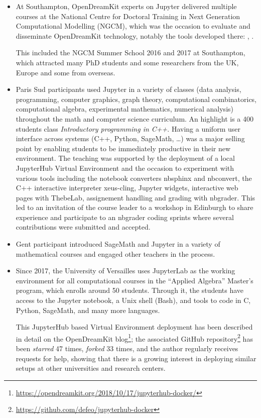 \documentclass{deliverablereport}
\begin{document}
\begin{itemize}
\item At Southampton, OpenDreamKit experts on Jupyter delivered
  multiple courses at the National Centre for Doctoral Training in
  Next Generation Computational Modelling (NGCM), which was the
  occasion to evaluate and disseminate OpenDreamKit technology,
  notably the tools developed there: ,
  .

  This included the NGCM Summer School 2016 and 2017 at Southampton,
  which attracted many PhD students and some researchers from the UK,
  Europe and some from overseas.

\item Paris Sud participants used Jupyter in a variety of classes
  (data analysis, programming, computer graphics, graph theory,
  computational combinatorics, computational algebra, experimental
  mathematics, numerical analysis) throughout the math and computer
  science curriculum. An highlight is a 400 students class
  \emph{Introductory programming in C++}. Having a uniform user
  interface across systems (C++, Python, SageMath, \ldots) was a major
  selling point by enabling students to be immediately productive in
  their new environment. The teaching was supported by the deployment
  of a local JupyterHub Virtual Environment and the occasion to
  experiment with various tools including the notebook converters
  nbsphinx and nbconvert, the C++ interactive interpreter xeus-cling,
  Jupyter widgets, interactive web pages with ThebeLab, assignement
  handling and grading with nbgrader. This led to an invitation of the
  course leader to a workshop in Edinburgh to share experience and
  participate to an nbgrader coding sprints where several
  contributions were submitted and accepted.
\item Gent participant introduced SageMath and Jupyter in a variety of
  mathematical courses and engaged other teachers in the process.

\item Since 2017, the University of Versailles uses JupyterLab as the
  working environment for all computational courses in the ``Applied
  Algebra'' Master's program, which enrolls around 50
  students. Through it, the students have access to the Jupyter
  notebook, a Unix shell (Bash), and tools to code in C, Python,
  SageMath, and many more languages.

  This JupyterHub based Virtual Environment deployment has been described in detail on
  the OpenDreamKit
  blog\footnote{\url{https://opendreamkit.org/2018/10/17/jupyterhub-docker/}};
  the associated GitHub
  repository\footnote{\url{https://github.com/defeo/jupyterhub-docker}}
  has been \emph{starred} 47 times, \emph{forked} 33 times, and the
  author regularly receives requests for help, showing that there is a
  growing interest in deploying similar setups at other universities
  and research centers.


\end{itemize}
\end{document}
